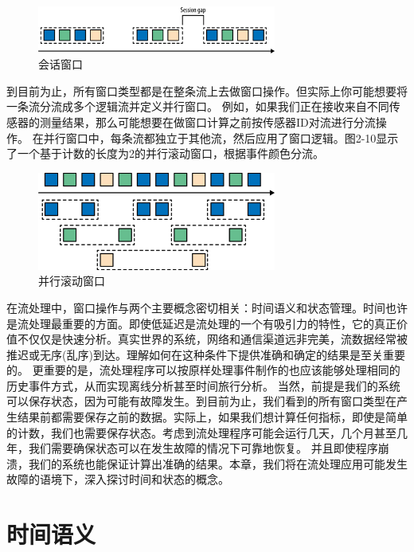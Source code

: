 \documentclass[cn,11pt,chinese]{elegantbook}
\begin{document}
\begin{itemize}
        \begin{figure}[htbp]
          \centering
          \includegraphics[width=0.7\textwidth]{images/spaf_0209.png}
          \caption{会话窗口}
        \end{figure}
\end{itemize}

到目前为止，所有窗口类型都是在整条流上去做窗口操作。但实际上你可能想要将一条流分流成多个逻辑流并定义并行窗口。 例如，如果我们正在接收来自不同传感器的测量结果，那么可能想要在做窗口计算之前按传感器ID对流进行分流操作。 在并行窗口中，每条流都独立于其他流，然后应用了窗口逻辑。图2-10显示了一个基于计数的长度为2的并行滚动窗口，根据事件颜色分流。

\begin{figure}[htbp]
    \centering
    \includegraphics[width=0.7\textwidth]{images/spaf_0210.png}
    \caption{并行滚动窗口}
\end{figure}

在流处理中，窗口操作与两个主要概念密切相关：时间语义和状态管理。时间也许是流处理最重要的方面。即使低延迟是流处理的一个有吸引力的特性，它的真正价值不仅仅是快速分析。真实世界的系统，网络和通信渠道远非完美，流数据经常被推迟或无序(乱序)到达。理解如何在这种条件下提供准确和确定的结果是至关重要的。 更重要的是，流处理程序可以按原样处理事件制作的也应该能够处理相同的历史事件方式，从而实现离线分析甚至时间旅行分析。 当然，前提是我们的系统可以保存状态，因为可能有故障发生。到目前为止，我们看到的所有窗口类型在产生结果前都需要保存之前的数据。实际上，如果我们想计算任何指标，即使是简单的计数，我们也需要保存状态。考虑到流处理程序可能会运行几天，几个月甚至几年，我们需要确保状态可以在发生故障的情况下可靠地恢复。 并且即使程序崩溃，我们的系统也能保证计算出准确的结果。本章，我们将在流处理应用可能发生故障的语境下，深入探讨时间和状态的概念。

\section{时间语义}
\end{document}
